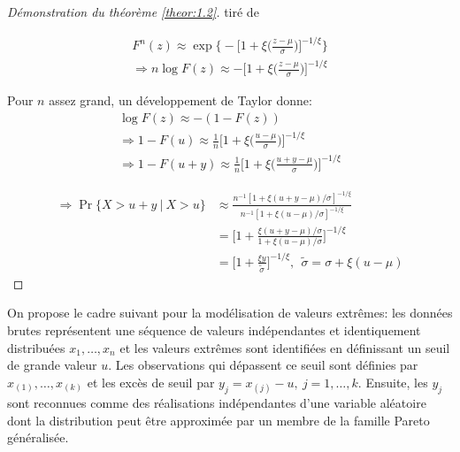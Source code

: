 \begin{proof}[Démonstration du théorème \ref{theor:1.2}] tiré de \cite{coles2001introduction}

\begin{equation*}
\begin{split}
F^n(z) \approx \exp \Bigg\{ - \Big[ 1 +\xi\Big(\frac{z-\mu}{\sigma}\Big) \Big]^{-1/\xi}  \Bigg\}\\
\Rightarrow n\log F(z) \approx - \Big[ 1 +\xi\Big(\frac{z-\mu}{\sigma}\Big) \Big]^{-1/\xi} 
\end{split}
\end{equation*}

Pour $n$ assez grand, un développement de Taylor donne:
\begin{equation*}
\begin{split}
\log F(z) \approx -(1-F(z))\\
\Rightarrow 1-F(u) \approx \frac{1}{n} \Big[ 1 +\xi\Big(\frac{u-\mu}{\sigma}\Big) \Big]^{-1/\xi}\\
\Rightarrow 1-F(u+y) \approx \frac{1}{n} \Big[ 1 +\xi\Big(\frac{u+y-\mu}{\sigma}\Big) \Big]^{-1/\xi}
\end{split}
\end{equation*}

\begin{equation*}
\begin{split}
\Rightarrow \Pr{\{ X>u+y\ |\ X>u \}} &\approx \frac{n^{-1}[1 + \xi(u+y-\mu)/\sigma]^{-1/\xi}}{n^{-1}[1 + \xi(u-\mu)/\sigma]^{-1/\xi}} \\
    &= \Bigg[ 1 + \frac{\xi(u+y-\mu)/\sigma}{1 + \xi(u-\mu)/\sigma}\Bigg]^{-1/\xi} \\
    &= \Bigg[1 + \frac{\xi y}{\tilde\sigma} \Bigg]^{-1/\xi},\ \ \tilde{\sigma} = \sigma + \xi(u - \mu)
\end{split}
\end{equation*}

\end{proof}


On propose le cadre suivant pour la modélisation de valeurs extrêmes: les données brutes représentent une séquence de valeurs indépendantes et identiquement distribuées $x_1,\dots,x_n$ et les valeurs extrêmes sont identifiées en définissant un seuil de grande valeur $u$. Les observations qui dépassent ce seuil sont définies par $x_{(1)},\dots,x_{(k)}$ et les excès de seuil par $y_j = x_{(j)} - u,\ j=1,\dots,k$. Ensuite, les $y_j$ sont reconnues comme des réalisations indépendantes d'une variable aléatoire dont la distribution peut être approximée par un membre de la famille Pareto généralisée.\\

